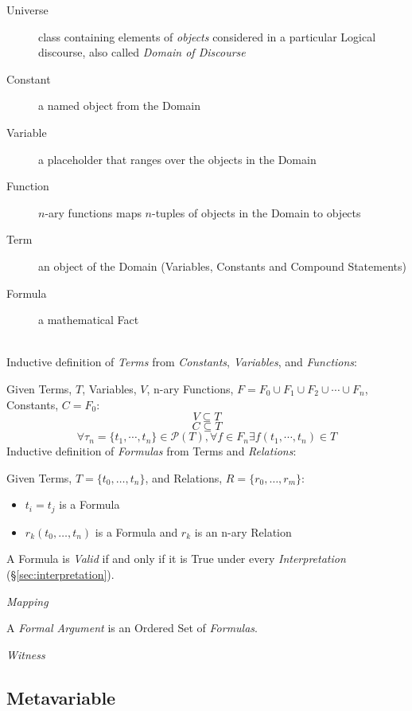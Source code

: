 \begin{description}
\item[Universe] class containing elements of \emph{objects} considered
  in a particular Logical discourse, also called \emph{Domain of
    Discourse}
\item[Constant] a named object from the Domain
\item[Variable] a placeholder that ranges over the objects in the
  Domain
\item[Function] $n$-ary functions maps $n$-tuples of objects in the
  Domain to objects
\item[Term] an object of the Domain (Variables, Constants and Compound
  Statements)
\item[Formula] a mathematical Fact
\end{description}
\hfill \\ Inductive definition of \emph{Terms} from \emph{Constants},
\emph{Variables}, and \emph{Functions}:

Given Terms, $T$, Variables, $V$, n-ary Functions, $F = F_0 \cup F_1
\cup F_2 \cup \cdots \cup F_n$, Constants, $C = F_0$:
\[
    V \subseteq T
\]\[
    C \subseteq T
\]\[
    \forall \tau_n=\{t_1,\cdots,t_n\} \in \mathcal{P}(T), \forall f \in F_n
    \exists f(t_1,\cdots,t_n) \in T
\]
Inductive definition of \emph{Formulas} from Terms and
\emph{Relations}:

Given Terms, $T = \{t_0,\ldots,t_n\}$, and Relations, $R = \{r_0,\ldots,r_m\}$:
\begin{itemize}
\item $t_i = t_j$ is a Formula
\item $r_k(t_0,\ldots,t_n)$ is a Formula and $r_k$ is an n-ary Relation
\end{itemize}
A Formula is \emph{Valid} if and only if it is True under every
\emph{Interpretation} (\S\ref{sec:interpretation}).

\emph{Mapping} %

A \emph{Formal Argument} is an Ordered Set of \emph{Formulas}.

\emph{Witness}



\subsection{Metavariable}\label{sec:metavariable}

